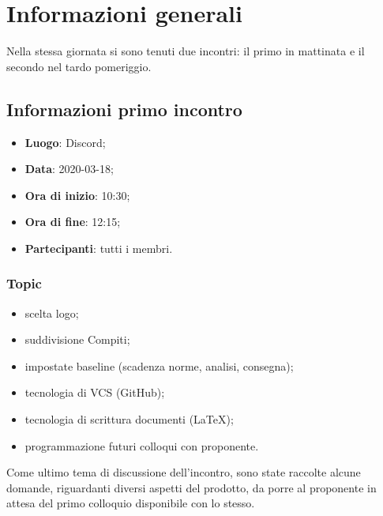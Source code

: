 \section{Informazioni generali}
Nella stessa giornata si sono tenuti due incontri: il primo in mattinata e il secondo nel tardo pomeriggio.
\subsection{Informazioni primo incontro}
\begin{itemize}
\item \textbf{Luogo}: Discord\glo;
\item \textbf{Data}: 2020-03-18;
\item \textbf{Ora di inizio}: 10:30;
\item \textbf{Ora di fine}: 12:15;
\item \textbf{Partecipanti}: tutti i membri.
\end{itemize}

\subsubsection{Topic}

\begin{itemize}
\item scelta logo;
\item suddivisione Compiti;
\item impostate baseline (scadenza norme, analisi, consegna);
\item tecnologia di VCS (GitHub);
\item tecnologia di scrittura documenti (LaTeX);
\item programmazione futuri colloqui con proponente.
\end{itemize}

Come ultimo tema di discussione dell'incontro, sono state raccolte alcune domande, riguardanti diversi aspetti del prodotto, da porre al proponente in attesa del primo colloquio disponibile con lo stesso. 

